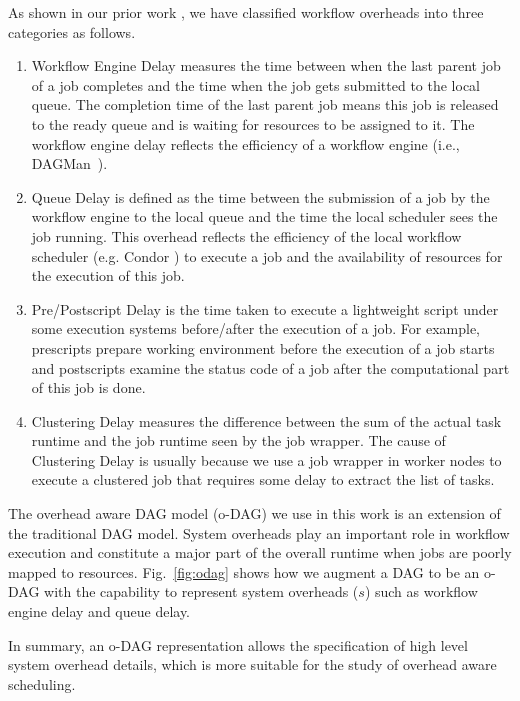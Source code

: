 \documentclass[final,5p,times,twocolumn]{elsarticle}
\begin{document}
As shown in our prior work \cite{Chen}, we have classified workflow overheads into three categories as follows. 
\begin{enumerate}

\item{Workflow Engine Delay} measures the time between when the last parent job of a job completes and the time when the job gets submitted to the local queue. The completion time of the last parent job means this job is released to the ready queue and is waiting for resources to be assigned to it. The workflow engine delay reflects the efficiency of a workflow engine (i.e., DAGMan~\cite{DAGMan}). 

\item{Queue Delay} is defined as the time between the submission of a job by the workflow engine to the local queue and the time the local scheduler sees the job running. This overhead reflects the efficiency of the local workflow scheduler (e.g. Condor \cite{Frey2002}) to execute a job and the availability of resources for the execution of this job. 

\item{Pre/Postscript Delay } is the time taken to execute a lightweight script under some execution systems before/after the execution of a job. For example, prescripts prepare working environment before the execution of a job starts and postscripts examine the status code of a job after the computational part of this job is done.

\item{Clustering Delay} measures the difference between the sum of the actual task runtime and the job runtime seen by the job wrapper. The cause of Clustering Delay is usually because we use a job wrapper in worker nodes to execute a clustered job that requires some delay to extract the list of tasks. 

\end{enumerate}

The overhead aware DAG model (o-DAG) we use in this work is an extension of the traditional DAG model. System overheads play an important role in workflow execution and constitute a major part of the overall runtime when jobs are poorly mapped to resources. Fig.~\ref{fig:odag} shows how we augment a DAG to be an o-DAG with the capability to represent system overheads ($s$) such as workflow engine delay and queue delay.  


In summary, an o-DAG representation allows the specification of high level system overhead details, which is more suitable for the study of overhead aware scheduling. 
\end{document}

